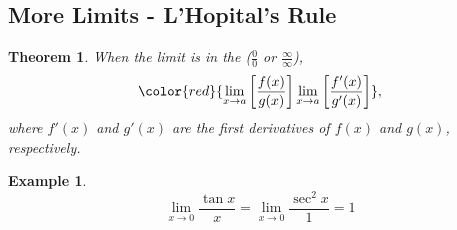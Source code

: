 \documentclass[12pt, a4paper]{article}
\newtheorem{theorem}{Theorem}[subsection]
\newtheorem{example}{Example}[subsection]
\begin{document}
\subsection{More Limits - L'Hopital's Rule}
\begin{theorem}
    When the limit is in the \textbf{\color{red}{indeterminant form}} ($\frac{0}{0}$ or $\frac{\infty}{\infty}$), 
    $${\color{red}{\lim_{x\rightarrow a}\left[\frac{f(x)}{g(x)}\right]\lim_{x\rightarrow a}\left[\frac{f'(x)}{g'(x)}\right]}},$$
    where $f'(x)$ and $g'(x)$ are the first derivatives of $f(x)$ and $g(x)$, respectively. 
\end{theorem}
\begin{example}
    $$\lim_{x\rightarrow 0}\frac{\tan x}{x}=\lim_{x\rightarrow 0}\frac{\sec^2x}{1}=1$$
\end{example}
\end{document}
